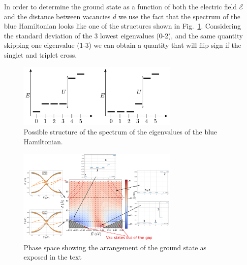 In order to determine the ground state as a function of both the electric field $\mathcal{E}$ and the distance between vacancies $d$ we use the fact that the spectrum of the blue Hamiltonian looks like one of the structures shown in Fig.~\ref{spectrum_dimer}. Considering the standard deviation of the 3 lowest eigenvalues (0-2), and the same quantity skipping one eigenvalue (1-3) we can obtain a quantity that will flip sign if the singlet and triplet cross.

\begin{figure}[h!]
\centering
  \includegraphics[width=0.7\textwidth]{artlat/fig/sketch_levels.pdf}
\vspace{-5pt}
\caption{Possible structure of the spectrum of the eigenvalues of the blue Hamiltonian.}
\label{spectrum_dimer}
\end{figure}
\FloatBarrier

\begin{figure}[h!]
\centering
  \includegraphics[width=0.7\textwidth]{artlat/fig/phase_J.pdf}
\vspace{-5pt}
\caption{Phase space showing the arrangement of the ground state as exposed in the text}
\label{}
\end{figure}
\FloatBarrier

